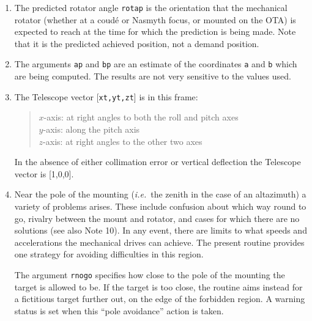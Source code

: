 \documentclass[12pt,fleqn,twoside]{article}
\renewcommand{\_}{{\tt\char'137}}     %
\begin{document}
{\begin{enumerate}
      ICRS $\approx$ FK5 J2000 to better than 25 mas.
\item The predicted rotator angle {\tt rotap} is the orientation that the
      mechanical rotator (whether at a coud\'e or Nasmyth focus, or
      mounted on the OTA) is expected to reach at the time for which
      the prediction is being made.  Note that it is the predicted
      achieved position, not a demand position.
\item The arguments {\tt ap} and {\tt bp} are an estimate of the coordinates
      {\tt a} and {\tt b} which are being computed.
      The results are not very
      sensitive to the values used.
\item The {\sc Telescope} vector [{\tt xt,yt,zt}] is in this frame:
      \begin{quote}
      $x$-axis:  at right angles to both the roll and pitch axes \\
      $y$-axis:  along the pitch axis \\
      $z$-axis:  at right angles to the other two axes
      \end{quote}
      In the absence of either collimation error or vertical deflection
      the {\sc Telescope} vector is [1,0,0].
\item Near the pole of the mounting ({\it i.e.}~the zenith in the case of an
      altazimuth) a variety of problems arises.  These include
      confusion about which way round to go, rivalry between the mount
      and rotator, and cases for which there are no solutions (see also
      Note 10).  In any event, there are limits to what speeds and
      accelerations the mechanical drives can achieve.  The present
      routine provides one strategy for avoiding difficulties in this
      region.

      The argument {\tt rnogo} specifies how close to the pole of the
      mounting the target is allowed to be.  If the target is too
      close, the routine aims instead for a fictitious target further
      out, on the edge of the forbidden region.  A warning status is
      set when this ``pole avoidance'' action is taken.


\end{enumerate}}
\end{document}
